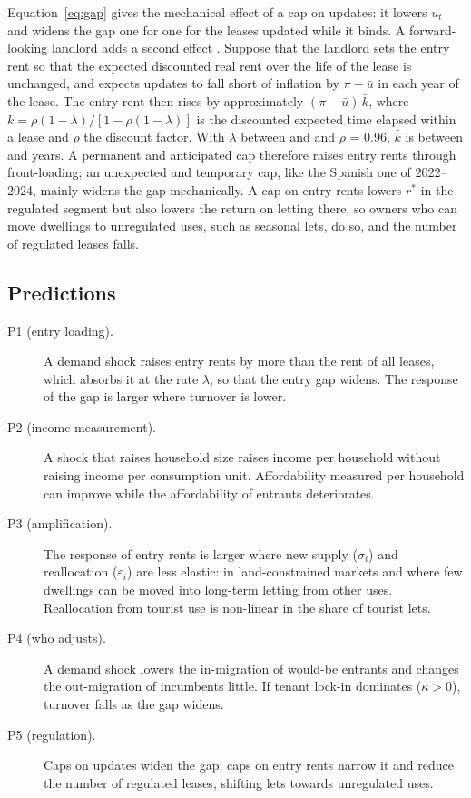 \documentclass[11pt,a4paper]{article}
\begin{document}
Equation~\eqref{eq:gap} gives the mechanical effect of a cap on updates: it lowers $u_t$ and widens the gap one for one for the leases updated while it binds. A forward-looking landlord adds a second effect \citep{basu2000}. Suppose that the landlord sets the entry rent so that the expected discounted real rent over the life of the lease is unchanged, and expects updates to fall short of inflation by $\pi-\bar u$ in each year of the lease. The entry rent then rises by approximately $(\pi-\bar u)\,\bar k$, where $\bar k=\rho(1-\lambda)/[1-\rho(1-\lambda)]$ is the discounted expected time elapsed within a lease and $\rho$ the discount factor. With $\lambda$ between \lamRangeLo{} and \lamRangeHi{} and $\rho$ = 0.96, $\bar k$ is between \mcKbarLo{} and \mcKbarHi{} years. A permanent and anticipated cap therefore raises entry rents through front-loading; an unexpected and temporary cap, like the Spanish one of 2022--2024, mainly widens the gap mechanically. A cap on entry rents lowers $r^*$ in the regulated segment but also lowers the return on letting there, so owners who can move dwellings to unregulated uses, such as seasonal lets, do so, and the number of regulated leases falls.

\subsection{Predictions}

\begin{description}
\item[P1 (entry loading).] A demand shock raises entry rents by more than the rent of all leases, which absorbs it at the rate $\lambda$, so that the entry gap widens. The response of the gap is larger where turnover is lower.
\item[P2 (income measurement).] A shock that raises household size raises income per household without raising income per consumption unit. Affordability measured per household can improve while the affordability of entrants deteriorates.
\item[P3 (amplification).] The response of entry rents is larger where new supply ($\sigma_i$) and reallocation ($\varepsilon_i$) are less elastic: in land-constrained markets and where few dwellings can be moved into long-term letting from other uses. Reallocation from tourist use is non-linear in the share of tourist lets.
\item[P4 (who adjusts).] A demand shock lowers the in-migration of would-be entrants and changes the out-migration of incumbents little. If tenant lock-in dominates ($\kappa>0$), turnover falls as the gap widens.
\item[P5 (regulation).] Caps on updates widen the gap; caps on entry rents narrow it and reduce the number of regulated leases, shifting lets towards unregulated uses.
\end{description}
\end{document}
